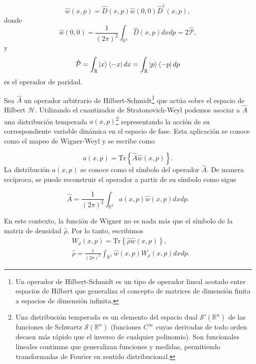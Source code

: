         \begin{equation}
            \hat{w}(x,p) = \hat{D}(x,p) \hat{w}(0,0)\hat{D}^\dagger(x,p),
        \end{equation}
        donde
        \begin{equation}
            \hat{w}(0,0) = \frac{1}{(2\pi)^{2}}\int_{\mathbb{R}^2}\hat{D}(x,p)dxdp = 2 \hat{\mathcal{P}},
        \end{equation}
        y
        \begin{equation}
            \hat{\mathcal{P}} = \int_\mathbb{R} \ket{x}\bra{-x}dx = \int_\mathbb{R}\ket{p}\bra{-p}dp
        \end{equation}
        es el operador de paridad.

        Sea $\hat{A}$ un operador arbitrario de Hilbert-Schmidt\footnote{Un operador de Hilbert-Schmidt es un tipo de operador lineal acotado entre espacios de Hilbert que generaliza el concepto de matrices de dimensión finita a espacios de dimensión infinita.} que actúa sobre el espacio de Hilbert $\mathcal{H}$. Utilizando el cuantizador de Stratonovich-Weyl podemos asociar a $\hat{A}$ una distribución temperada $a(x,p)$\footnote{Una distribución temperada es un elemento del espacio dual $\mathcal{S}'(\mathbb{R}^n)$ de las funciones de Schwartz $\mathcal{S}(\mathbb{R}^n)$ (funciones $C^\infty$ cuyas derivadas de todo orden decaen más rápido que el inverso de cualquier polinomio). Son funcionales lineales continuas que generalizan funciones y medidas, permitiendo transformadas de Fourier en sentido distribucional.} representando la acción de su correspondiente variable dinámica en el espacio de fase. Esta aplicación se conoce como el mapeo de Wigner-Weyl y se escribe como

        \begin{equation}
            a(x,p) = \mathrm{Tr}\left\{ \hat{A}\hat{w}(x,p) \right\}.
        \end{equation}
        La distribución $a(x,p)$ se conoce como el símbolo del operador $\hat{A}$. De manera recíproca, se puede reconstruir el operador a partir de su símbolo como sigue

        \begin{equation}
            \hat{A}=\frac{1}{(2\pi)^2}\int_{\mathbb{R}^2}a(x,p) \hat{w}(x,p)dxdp.
        \end{equation}

        En este contexto, la función de Wigner no es nada más que el símbolo de la matriz de densidad $\hat{\rho}$. Por lo tanto, escribimos
        \begin{align}
            & W_\rho (x,p) = \mathrm{Tr}\left\{ \hat{\rho}\hat{w}(x,p) \right\},\\
            & \hat{\rho} = \frac{1}{(2\pi)^2}\int_\mathbb{R^2}\hat{w}(x,p)W_\rho(x,p)dxdp.
        \end{align}


